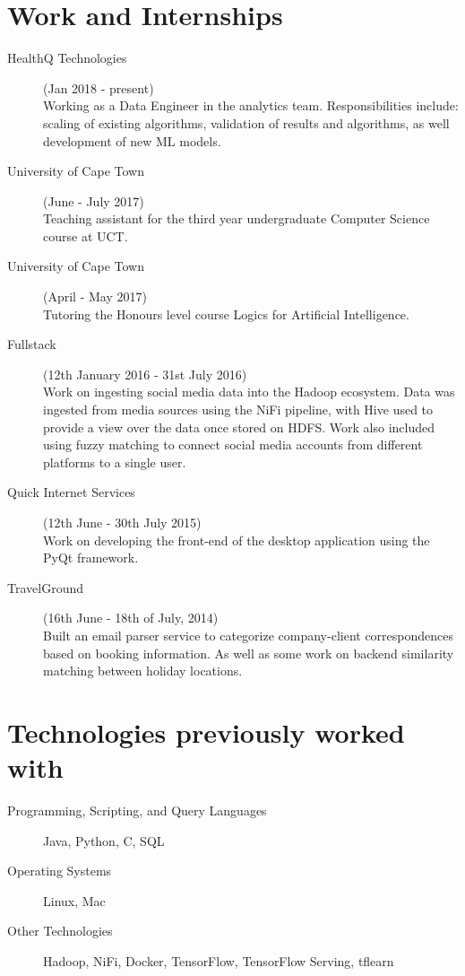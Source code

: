 \documentclass[margin,line,a4paper]{resume}
\begin{document}
\begin{resume}
        \section{\mysidestyle Work and Internships}
            \begin{description}
            	\item[HealthQ Technologies] (Jan 2018 - present) \\
            		Working as a Data Engineer in the analytics team. Responsibilities include: scaling of existing algorithms, validation of results and algorithms, as well development of new ML models.

            	\item[University of Cape Town] (June - July 2017) \\
            		Teaching assistant for the third year undergraduate Computer Science course at UCT.

            	\item[University of Cape Town] (April - May 2017) \\
            		Tutoring the Honours level course Logics for Artificial Intelligence.

                \item[Fullstack] (12th January 2016 - 31st July 2016) \\
                    Work on ingesting social media data into the Hadoop ecosystem. Data was ingested from media sources using the NiFi pipeline, with Hive used to provide a view over the data once stored on HDFS. Work also included using fuzzy matching to connect social media accounts from different platforms to a single user.

                \item[Quick Internet Services] (12th June - 30th July 2015) \\
                    Work on developing the front-end of the desktop application using the PyQt framework.

                \item[TravelGround] (16th June - 18th of July, 2014) \\
                    Built an email parser service to categorize company-client correspondences based on booking information. As well as some work on backend similarity matching between holiday locations.

            \end{description}

        \section{\mysidestyle Technologies previously worked with}
        	\begin{description}
	        	\item [Programming, Scripting, and Query Languages] Java, Python, C, SQL
	 			\item [Operating Systems] Linux, Mac
	 			\item [Other Technologies] Hadoop, NiFi, Docker, TensorFlow, TensorFlow Serving, tflearn
	 		\end{description}


\end{resume}
\end{document}
